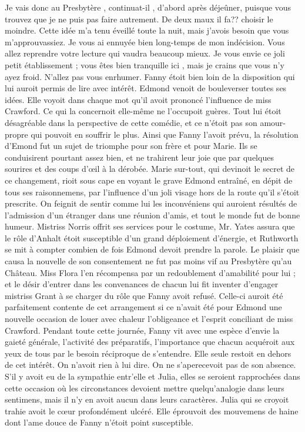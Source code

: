 Je vais donc au Presbytère , continuat-il , d'abord après déjeûner, puisque vous trouvez que je ne puis pas faire autrement. De deux maux il fa?? choisir le moindre. Cette idée m'a tenu éveillé toute la nuit, mais j'avois besoin que vous m'approuvassiez. Je vous ai ennuyée bien long-temps de mon indécision. Vous allez reprendre votre lecture qui vaudra beaucoup mieux. Je vous envie ce joli petit établissement ; vous êtes bien tranquille ici , mais je crains que vous n'y ayez froid. N'allez pas vous enrhumer.
Fanny étoit bien loin de la disposition qui lui auroit permis de lire avec intérêt. Edmond venoit de bouleverser toutes ses idées. Elle voyoit dans chaque mot qu'il avoit prononcé l'influence de miss Crawford. Ce qui la concernoit elle-même ne l'occupoit guères. Tout lui étoit désagréable dans la perspective de cette comédie, et ce n'étoit pas son amour-propre qui pouvoit en souffrir le plus.\setcounter{page}{124} Ainsi que Fanny l'avoit prévu, la résolution d'Emond fut un sujet de triomphe pour son frère et pour Marie. Ils se conduisirent pourtant assez bien, et ne trahirent leur joie que par quelques sourires et des coups d'œil à la dérobée. Marie sur-tout, qui devinoit le secret de ce changement, rioit sous cape en voyant le grave Edmond entraîné, en dépit de tous ses raisonnemens, par l'influence d'un joli visage hors de la route qu'il s'étoit prescrite.
On feignit de sentir comme lui les inconvéniens qui auroient résultés de l'admission d'un étranger dans une réunion d'amis, et tout le monde fut de bonne humeur. Mistriss Norris offrit ses services pour le costume, Mr. Yates assura que le rôle d'Anhalt étoit susceptible d'un grand déploiement d'énergie, et Ruthworth se mit à compter combien de fois Edmond devoit prendre la parole.
Le plaisir que causa la nouvelle de son consentement ne fut pas moins vif au Presbytère qu'au Château. Miss Flora l'en récompensa par un redoublement d'amabilité pour lui ; et le désir d'entrer dans les convenances de chacun lui fit inventer d'engager mistriss Grant à se charger du rôle que Fanny avoit refusé. Celle-ci auroit été parfaitement\setcounter{page}{125} contente de cet arrangement si ce n'avait été pour Edmond une nouvelle occasion de louer avec chaleur l'obligeance et l'esprit conciliant de miss Crawford. Pendant toute cette journée, Fanny vit avec une espèce d'envie la gaieté générale, l'activité des préparatifs, l'importance que chacun acquéroit aux yeux de tous par le besoin réciproque de s'entendre. Elle seule restoit en dehors de cet intérêt. On n'avoit rien à lui dire. On ne s'aperecevoit pas de son absence. S'il y avoit eu de la sympathie entr'elle et Julia, elles se seroient rapprochées dans cette occasion où les circonstances devoient mettre quelqu'analogie dans leurs sentimens, mais il n'y en avoit aucun dans leurs caractères. Julia qui se croyoit trahie avoit le cœur profondément ulcéré. Elle éprouvoit des mouvemens de haine dont l'ame douce de Fanny n'étoit point susceptible.
